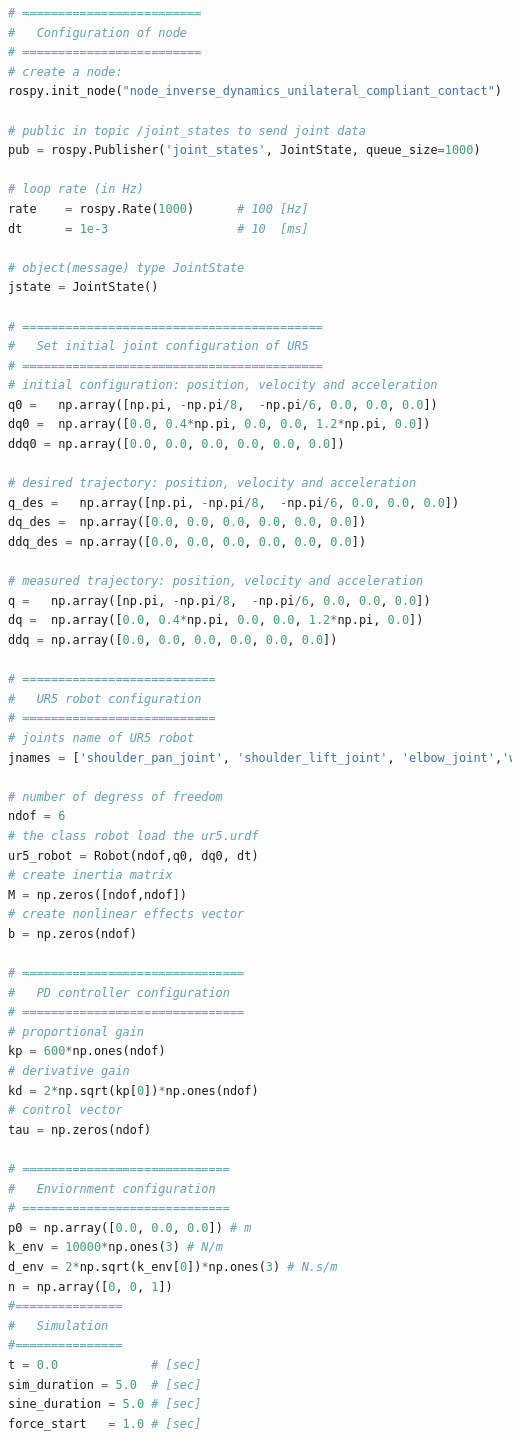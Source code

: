 \begin{lstlisting}[language=Python,caption={Move the second and fifth joint of UR5 robot with the required movement of activity 2.7.2.}, label={lst:inverse_dynamics_unilateral_compliant_contact_xyz}]
# =========================
#   Configuration of node
# =========================
# create a node: 
rospy.init_node("node_inverse_dynamics_unilateral_compliant_contact")

# public in topic /joint_states	to send joint data	
pub = rospy.Publisher('joint_states', JointState, queue_size=1000)

# loop rate (in Hz)
rate 	= rospy.Rate(1000)		# 100 [Hz]
dt 		= 1e-3					# 10  [ms]

# object(message) type JointState
jstate = JointState()

# ==========================================
#   Set initial joint configuration of UR5
# ==========================================
# initial configuration: position, velocity and acceleration 
q0 =   np.array([np.pi, -np.pi/8,  -np.pi/6, 0.0, 0.0, 0.0])
dq0 =  np.array([0.0, 0.4*np.pi, 0.0, 0.0, 1.2*np.pi, 0.0]) 
ddq0 = np.array([0.0, 0.0, 0.0, 0.0, 0.0, 0.0]) 

# desired trajectory: position, velocity and acceleration
q_des =   np.array([np.pi, -np.pi/8,  -np.pi/6, 0.0, 0.0, 0.0]) 
dq_des =  np.array([0.0, 0.0, 0.0, 0.0, 0.0, 0.0]) 
ddq_des = np.array([0.0, 0.0, 0.0, 0.0, 0.0, 0.0]) 

# measured trajectory: position, velocity and acceleration
q =   np.array([np.pi, -np.pi/8,  -np.pi/6, 0.0, 0.0, 0.0])
dq =  np.array([0.0, 0.4*np.pi, 0.0, 0.0, 1.2*np.pi, 0.0]) 
ddq = np.array([0.0, 0.0, 0.0, 0.0, 0.0, 0.0]) 

# ===========================
#   UR5 robot configuration
# ===========================
# joints name of UR5 robot
jnames = ['shoulder_pan_joint', 'shoulder_lift_joint', 'elbow_joint','wrist_1_joint', 'wrist_2_joint', 'wrist_3_joint']

# number of degress of freedom
ndof = 6
# the class robot load the ur5.urdf
ur5_robot = Robot(ndof,q0, dq0, dt)
# create inertia matrix 
M = np.zeros([ndof,ndof])
# create nonlinear effects vector
b = np.zeros(ndof)

# ===============================
#   PD controller configuration
# ===============================
# proportional gain
kp = 600*np.ones(ndof)
# derivative gain
kd = 2*np.sqrt(kp[0])*np.ones(ndof)
# control vector
tau = np.zeros(ndof) 

# =============================
#   Enviornment configuration
# =============================
p0 = np.array([0.0, 0.0, 0.0]) # m
k_env = 10000*np.ones(3) # N/m
d_env = 2*np.sqrt(k_env[0])*np.ones(3) # N.s/m
n = np.array([0, 0, 1])
#===============
#   Simulation
#===============
t = 0.0             # [sec] 
sim_duration = 5.0  # [sec]
sine_duration = 5.0 # [sec]
force_start   = 1.0 # [sec]



\end{lstlisting}
